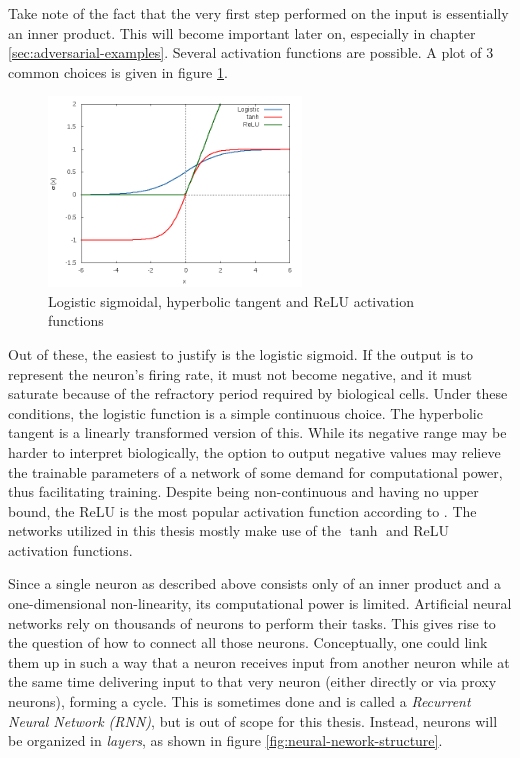 \documentclass[11pt, a4paper]{article}
\begin{document}
Take note of the fact that the very first step performed on the input is essentially an inner product. This will become important later on, especially in chapter \ref{sec:adversarial-examples}. Several activation functions are possible. A plot of 3 common choices is given in figure \ref{fig:activation-functions}.

\begin{figure}[h!tb]
	\centering
	\includegraphics[width=0.6\textwidth]{images/activation_functions.png}
	\caption[Activation functions]{Logistic sigmoidal, hyperbolic tangent and ReLU activation functions}
	\label{fig:activation-functions}
\end{figure}

Out of these, the easiest to justify is the logistic sigmoid. If the output is to represent the neuron's firing rate, it must not become negative, and it must saturate because of the refractory period required by biological cells. Under these conditions, the logistic function is a simple continuous choice. The hyperbolic tangent is a linearly transformed version of this. While its negative range may be harder to interpret biologically, the option to output negative values may relieve the trainable parameters of a network of some demand for computational power, thus facilitating training. Despite being non-continuous and having no upper bound, the ReLU is the most popular activation function according to \cite{deep-learning}. The networks utilized in this thesis mostly make use of the $\tanh$ and ReLU activation functions.

Since a single neuron as described above consists only of an inner product and a one-dimensional non-linearity, its computational power is limited. Artificial neural networks rely on thousands of neurons to perform their tasks. This gives rise to the question of how to connect all those neurons. Conceptually, one could link them up in such a way that a neuron receives input from another neuron while at the same time delivering input to that very neuron (either directly or via proxy neurons), forming a cycle. This is sometimes done and is called a \emph{Recurrent Neural Network (RNN)}, but is out of scope for this thesis. Instead, neurons will be organized in \emph{layers}, as shown in figure \ref{fig:neural-nework-structure}.
\end{document}
